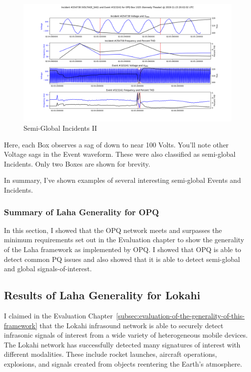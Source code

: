 \begin{figure}[H]
    \centering
    \includegraphics[width=\linewidth]{figures/vsag_g_2.png}
    \caption{Semi-Global Incidents II}
    \label{fig:i_2}
\end{figure}

Here, each Box observes a sag of down to near 100 Volts. You'll note other Voltage sags in the Event waveform. These were also classified as semi-global Incidents. Only two Boxes are shown for brevity.

In summary, I've shown examples of several interesting semi-global Events and Incidents.

\subsubsection{Summary of Laha Generality for OPQ}

In this section, I showed that the OPQ network meets and surpasses the minimum requirements set out in the Evaluation chapter to show the generality of the Laha framework as implemented by OPQ. I showed that OPQ is able to detect common PQ issues and also showed that it is able to detect semi-global and global signals-of-interest.

\subsection{Results of Laha Generality for Lokahi}\label{subsec:results-of-laha-generality-for-lokahi}

I claimed in the Evaluation Chapter~\ref{subsec:evaluation-of-the-generality-of-this-framework} that the Lokahi infrasound network is able to securely detect infrasonic signals of interest from a wide variety of heterogeneous mobile devices. The Lokahi network has successfully detected many signatures of interest with different modalities. These include rocket launches, aircraft operations, explosions, and signals created from objects reentering the Earth's atmosphere.

